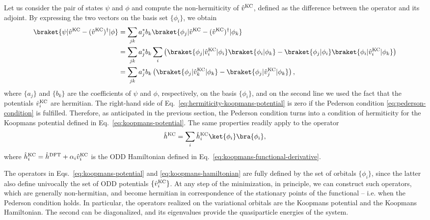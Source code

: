 Let us consider the pair of states $\psi$ and $\phi$ and compute the non-hermiticity of $\hat{v}^{\rm KC}$, defined as the difference between the operator and its adjoint. By expressing the two vectors on the basis set $\{ \phi_i \}$, we obtain
%
\begin{equation}
    \begin{split}
    \braket{\psi | \hat{v}^{\rm KC} - (\hat{v}^{\rm KC})^{\dagger} | \phi} &= \sum_{jk} a_j^* b_k \braket{\phi_j|\hat{v}^{\rm KC} - (\hat{v}^{\rm KC})^{\dagger}|\phi_k} \\
    &= \sum_{jk} a_j^* b_k \sum_i \left( \braket{\phi_j|\hat{v}_i^{\rm KC}|\phi_i}\braket{\phi_i|\phi_k} - \braket{\phi_j|\phi_i}\braket{\phi_i|\hat{v}_i^{\rm KC}|\phi_k} \right) \\
    &= \sum_{jk} a_j^* b_k \left( \braket{\phi_j|\hat{v}_k^{\rm KC}|\phi_k} - \braket{\phi_j|\hat{v}_j^{\rm KC}|\phi_k} \right) ,
    \end{split}
    \label{eq:hermiticity-koopmans-potential}
\end{equation}
%
where $\{ a_j \}$ and $\{ b_k \}$ are the coefficients of $\psi$ and $\phi$, respectively, on the basis $\{ \phi_i \}$, and on the second line we used the fact that the potentials $\hat{v}_i^{\rm KC}$ are hermitian. The right-hand side of Eq.~\eqref{eq:hermiticity-koopmans-potential} is zero if the Pederson condition \eqref{eq:pederson-condition} is fulfilled. Therefore, as anticipated in the previous section, the Pederson condition turns into a condition of hermiticity for the Koopmans potential defined in Eq.~\eqref{eq:koopmans-potential}. The same properties readily apply to the operator
%
\begin{equation}
    \hat{h}^{\rm KC} = \sum_i \hat{h}_i^{\rm KC} \ket{\phi_i} \bra{\phi_i} ,
    \label{eq:koopmans-hamiltonian}
\end{equation}
%
where $\hat{h}_i^{\rm KC} = \hat{h}^{\rm DFT} + \alpha_i \hat{v}_i^{\rm KC}$ is the ODD Hamiltonian defined in Eq.~\eqref{eq:koopmans-functional-derivative}.

The operators in Eqs.~\eqref{eq:koopmans-potential} and \eqref{eq:koopmans-hamiltonian} are fully defined by the set of orbitals $\{ \phi_i \}$, since the latter also define univocally the set of ODD potentials $\{ \hat{v}_i^{\rm KC} \}$. At any step of the minimization, in principle, we can construct such operators, which are generally non-hermitian, and become hermitian in correspondence of the stationary points of the functional -- i.e. when the Pederson condition holds. In particular, the operators realized on the variational orbitals are the Koopmans potential and the Koopmans Hamiltonian. The second can be diagonalized, and its eigenvalues provide the quasiparticle energies of the system.

